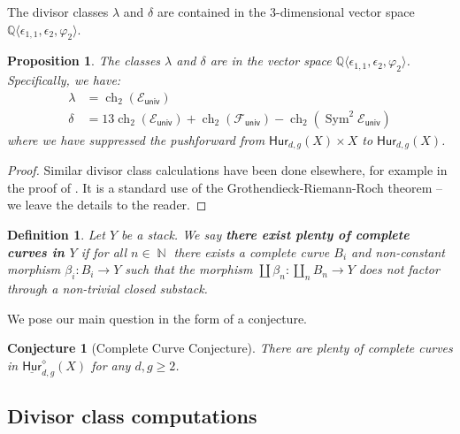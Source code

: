 \documentclass[reqno, 11pt]{amsart}
\newtheorem{proposition}[theorem]{Proposition}
\newtheorem{definition}[theorem]{Definition}
\newtheorem{conjecture}[theorem]{Conjecture}
\newcommand{\Q}{\mathbb{Q}}
\newcommand{\HdgX}{\mathsf{Hur}_{d,g}(X)}
\DeclareMathOperator{\ch}{ch}
\DeclareMathOperator{\Sym}{Sym}
\DeclareMathOperator{\N}{\mathbb{N}}
\DeclareMathOperator{\univ}{\mathsf{univ}}
\newcommand{\Hurfixedstable}[2]{\underline{\mathsf{Hur}}_{#1,#2}^{\diamond}}
\begin{document}
The divisor classes $\lambda$ and $\delta$ are contained in the $3$-dimensional vector space $\Q \langle \epsilon_{1,1}, \epsilon_{2}, \varphi_{2} \rangle$. 

\begin{proposition}
    \label{proposition:linearsystem} The classes $\lambda$ and $\delta$ are in the vector space $\Q \langle \epsilon_{1,1}, \epsilon_{2}, \varphi_{2} \rangle$. Specifically, we have: 
    \begin{align*}
        \label{equation:linearsystem}
        \lambda &=  \ch_{2}(\mathcal{E}_{\univ}) \\
        \delta &= 13 \ch_{2}(\mathcal{E}_{\univ}) + \ch_{2}(\mathcal{F}_{\univ}) - \ch_{2}(\Sym^{2}\mathcal{E}_{\univ})
    \end{align*}
    where we have suppressed the pushforward from $\HdgX \times X$ to $\HdgX$.
\end{proposition}

\begin{proof}
    Similar divisor class calculations have been done elsewhere, for example in the proof of \cite[Proposition 2.8]{deopurkar2018syzygy}.  It is a standard use of the Grothendieck-Riemann-Roch theorem -- we leave the details to the reader.
\end{proof}



\begin{definition}
    \label{definition:completecurve} Let $Y$ be a stack.  We say {\bf there exist plenty of complete curves in $Y$} if for all $n \in \N$ there exists a complete curve $B_{i}$ and non-constant morphism $\beta_{i}:B_{i} \to Y$ such that the morphism $\coprod \beta_{n}: \coprod_{n}B_{n} \to Y$  does not factor through a non-trivial closed substack.
\end{definition}

We pose our main question in the form of a conjecture. 

\begin{conjecture}[Complete Curve Conjecture]
    \label{conjecture:completecurve} There are plenty of complete curves in $\Hurfixedstable{d}{g}(X)$ for any $d,g \geq 2$.
\end{conjecture}




\subsection{Divisor class computations}
\end{document}
